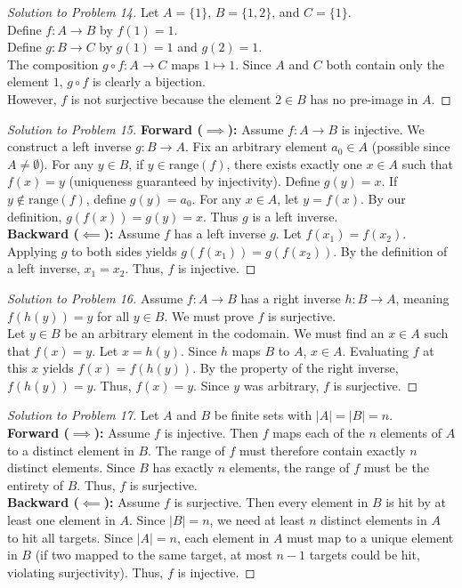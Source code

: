 \documentclass[11pt, letterpaper]{article}
\theoremstyle{definition}
\theoremstyle{remark}
\begin{document}
\begin{proof}[Solution to Problem 14]
Let $A = \{1\}$, $B = \{1, 2\}$, and $C = \{1\}$. \\
Define $f : A \to B$ by $f(1) = 1$. \\
Define $g : B \to C$ by $g(1) = 1$ and $g(2) = 1$. \\
The composition $g \circ f : A \to C$ maps $1 \mapsto 1$. Since $A$ and $C$ both contain only the element $1$, $g \circ f$ is clearly a bijection. \\
However, $f$ is not surjective because the element $2 \in B$ has no pre-image in $A$.
\end{proof}

\begin{proof}[Solution to Problem 15]
\textbf{Forward ($\implies$):} Assume $f : A \to B$ is injective. We construct a left inverse $g : B \to A$. Fix an arbitrary element $a_0 \in A$ (possible since $A \neq \emptyset$). For any $y \in B$, if $y \in \text{range}(f)$, there exists exactly one $x \in A$ such that $f(x) = y$ (uniqueness guaranteed by injectivity). Define $g(y) = x$. If $y \notin \text{range}(f)$, define $g(y) = a_0$. For any $x \in A$, let $y = f(x)$. By our definition, $g(f(x)) = g(y) = x$. Thus $g$ is a left inverse. \\
\textbf{Backward ($\impliedby$):} Assume $f$ has a left inverse $g$. Let $f(x_1) = f(x_2)$. Applying $g$ to both sides yields $g(f(x_1)) = g(f(x_2))$. By the definition of a left inverse, $x_1 = x_2$. Thus, $f$ is injective.
\end{proof}

\begin{proof}[Solution to Problem 16]
Assume $f : A \to B$ has a right inverse $h : B \to A$, meaning $f(h(y)) = y$ for all $y \in B$. We must prove $f$ is surjective. \\
Let $y \in B$ be an arbitrary element in the codomain. We must find an $x \in A$ such that $f(x) = y$. Let $x = h(y)$. Since $h$ maps $B$ to $A$, $x \in A$. Evaluating $f$ at this $x$ yields $f(x) = f(h(y))$. By the property of the right inverse, $f(h(y)) = y$. Thus, $f(x) = y$. Since $y$ was arbitrary, $f$ is surjective.
\end{proof}

\begin{proof}[Solution to Problem 17]
Let $A$ and $B$ be finite sets with $|A| = |B| = n$. \\
\textbf{Forward ($\implies$):} Assume $f$ is injective. Then $f$ maps each of the $n$ elements of $A$ to a distinct element in $B$. The range of $f$ must therefore contain exactly $n$ distinct elements. Since $B$ has exactly $n$ elements, the range of $f$ must be the entirety of $B$. Thus, $f$ is surjective. \\
\textbf{Backward ($\impliedby$):} Assume $f$ is surjective. Then every element in $B$ is hit by at least one element in $A$. Since $|B| = n$, we need at least $n$ distinct elements in $A$ to hit all targets. Since $|A| = n$, each element in $A$ must map to a unique element in $B$ (if two mapped to the same target, at most $n-1$ targets could be hit, violating surjectivity). Thus, $f$ is injective.
\end{proof}
\end{document}
